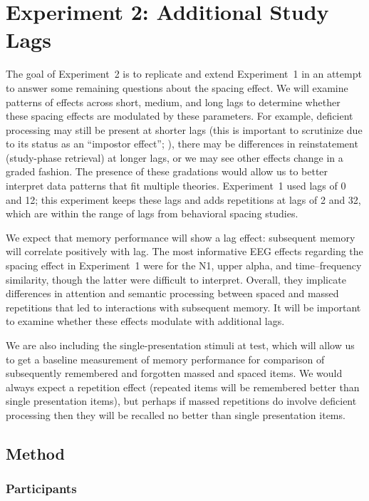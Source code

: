 
\section{Experiment 2: Additional Study Lags}

The goal of Experiment~2 is to replicate and extend Experiment~1 in an attempt to answer some remaining questions about the spacing effect.  We will examine patterns of effects across short, medium, and long lags to determine whether these spacing effects are modulated by these parameters.  For example, deficient processing may still be present at shorter lags (this is important to scrutinize due to its status as an ``impostor effect''; ), there may be differences in reinstatement (study-phase retrieval) at longer lags, or we may see other effects change in a graded fashion.
The presence of these gradations would allow us to better interpret data patterns that fit multiple theories.  Experiment~1 used lags of 0 and 12; this experiment keeps these lags and adds repetitions at lags of 2 and 32, which are within the range of lags from behavioral spacing studies.

We expect that memory performance will show a lag effect: subsequent memory will correlate positively with lag.  The most informative EEG effects regarding the spacing effect in Experiment~1 were for the N1, upper alpha, and time--frequency similarity, though the latter were difficult to interpret.  Overall, they implicate differences in attention and semantic processing between spaced and massed repetitions that led to interactions with subsequent memory.  It will be important to examine whether these effects modulate with additional lags.

We are also including the single-presentation stimuli at test, which will allow us to get a baseline measurement of memory performance for comparison of subsequently remembered and forgotten massed and spaced items.  We would always expect a repetition effect (repeated items will be remembered better than single presentation items), but perhaps if massed repetitions do involve deficient processing then they will be recalled no better than single presentation items.

\subsection{Method}

\subsubsection{Participants}

